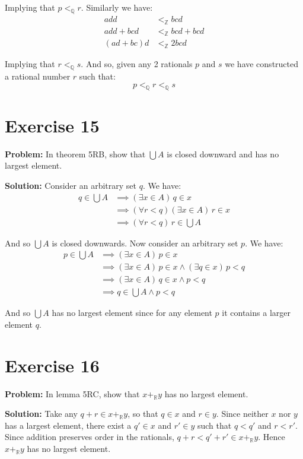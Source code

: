 \documentclass{article}
\begin{document}
Implying that $p<_\mathbb Q r$. Similarly we have:
\begin{align*}
    add&<_\mathbb Z bcd\\
    add+bcd&<_\mathbb Z bcd+bcd\\
    (ad+bc)d&<_\mathbb Z 2bcd
\end{align*}

Implying that $r<_\mathbb Q s$. And so, given any 2 rationals $p$ and $s$ we have constructed a rational number $r$ such that:
\begin{equation*}
    p<_\mathbb Q r<_\mathbb Q s
\end{equation*}

\section*{Exercise 15}
\noindent\textbf{Problem:} In theorem 5RB, show that $\bigcup A$ is closed downward and has no largest element.
\bigskip

\noindent\textbf{Solution:} Consider an arbitrary set $q$. We have:
\begin{align*}
    q\in\bigcup A&\implies(\exists x\in A)\,q\in x\\
    &\implies(\forall r<q)(\exists x\in A)\,r\in x\tag{$x$ is closed downwards}\\
    &\implies(\forall r<q)\,r\in \bigcup A
\end{align*}

And so $\bigcup A$ is closed downwards. Now consider an arbitrary set $p$. We have:
\begin{align*}
    p\in\bigcup A&\implies(\exists x\in A)\,p\in x\\
    &\implies(\exists x\in A)\,p\in x\wedge (\exists q\in x)\,p<q\tag{$x$ has no largest element}\\
    &\implies(\exists x\in A)\,q\in x\wedge p<q\\
    &\implies q\in\bigcup A\wedge p<q
\end{align*}

And so $\bigcup A$ has no largest element since for any element $p$ it contains a larger element $q$.

\section*{Exercise 16}
\noindent\textbf{Problem:} In lemma 5RC, show that $x+_\mathbb R y$ has no largest element.
\bigskip

\noindent\textbf{Solution:} Take any $q + r \in x +_\mathbb R y$, so that $q \in x$ and $r \in y$. Since neither $x$ nor $y$ has a largest element, there exist a $q'\in x$ and $r'\in y$ such that $q < q'$ and $r < r'$. Since addition preserves order in the rationals, $q + r < q' + r' \in x +_\mathbb R y$. Hence $x +_\mathbb R y$ has no largest element.
\end{document}
